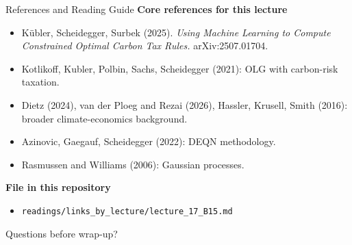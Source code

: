 \documentclass[aspectratio=169,11pt]{beamer}
\newcommand{\emphc}[1]{\textcolor{harvardcrimson}{#1}}
\begin{document}
\begin{frame}{References and Reading Guide}
\small
\textbf{Core references for this lecture}
\begin{itemize}
    \item K\"ubler, Scheidegger, Surbek (2025). \emph{Using Machine Learning to Compute Constrained Optimal Carbon Tax Rules.} arXiv:2507.01704.
    \item Kotlikoff, Kubler, Polbin, Sachs, Scheidegger (2021): OLG with carbon-risk taxation.
    \item Dietz (2024), van der Ploeg and Rezai (2026), Hassler, Krusell, Smith (2016): broader climate-economics background.
    \item Azinovic, Gaegauf, Scheidegger (2022): DEQN methodology.
    \item Rasmussen and Williams (2006): Gaussian processes.
\end{itemize}

\vspace{0.25cm}
\textbf{File in this repository}
\begin{itemize}
    \item \texttt{readings/links\_by\_lecture/lecture\_17\_B15.md}
\end{itemize}

\vspace{0.3cm}
\begin{center}
{\LARGE \emphc{Questions before wrap-up?}}
\end{center}
\end{frame}
\end{document}

